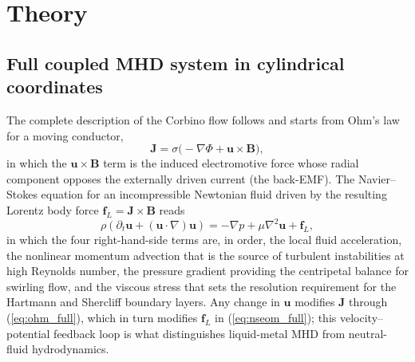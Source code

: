 \documentclass[aps,prl,twocolumn,superscriptaddress]{revtex4-2}
\begin{document}
\section{Theory}

\subsection{Full coupled MHD system in cylindrical coordinates}
\label{sec:full_mhd}

The complete description of the Corbino flow follows
\cite{8} and starts from Ohm's law for a moving conductor,
\begin{equation}
\mathbf{J} = \sigma\bigl(-\nabla\Phi + \mathbf{u}\!\times\!\mathbf{B}\bigr),
\label{eq:ohm_full}
\end{equation}
in which the $\mathbf{u}\!\times\!\mathbf{B}$ term is the induced
electromotive force whose radial component opposes the externally
driven current (the back-EMF).  The Navier--Stokes equation for an
incompressible Newtonian fluid driven by the resulting Lorentz body
force $\mathbf{f}_L = \mathbf{J}\!\times\!\mathbf{B}$ reads
\begin{equation}
\rho\!\left(\partial_t\mathbf{u}+(\mathbf{u}\!\cdot\!\nabla)\mathbf{u}\right)
= -\nabla p + \mu\nabla^{2}\mathbf{u} + \mathbf{f}_{L},
\label{eq:nseom_full}
\end{equation}
in which the four right-hand-side terms are, in order, the local fluid
acceleration, the nonlinear momentum advection that is the source of
turbulent instabilities at high Reynolds number, the pressure gradient
providing the centripetal balance for swirling flow, and the viscous
stress that sets the resolution requirement for the Hartmann and
Shercliff boundary layers.  Any change in $\mathbf{u}$ modifies
$\mathbf{J}$ through (\ref{eq:ohm_full}), which in turn modifies
$\mathbf{f}_L$ in (\ref{eq:nseom_full}); this velocity--potential
feedback loop is what distinguishes liquid-metal MHD from
neutral-fluid hydrodynamics.
\end{document}
